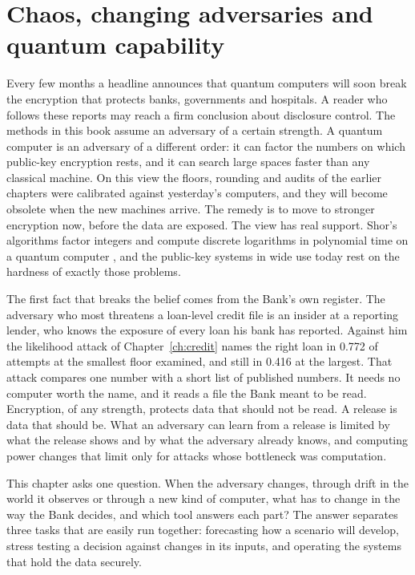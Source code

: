\chapter{Chaos, changing adversaries and quantum capability}\label{ch:chaos}

Every few months a headline announces that quantum computers will soon break the encryption
that protects banks, governments and hospitals. A reader who follows these reports may reach
a firm conclusion about disclosure control. The methods in this book assume an adversary of a
certain strength. A quantum computer is an adversary of a different order: it can factor the
numbers on which public-key encryption rests, and it can search large spaces faster than any
classical machine. On this view the floors, rounding and audits of the earlier chapters were
calibrated against yesterday's computers, and they will become obsolete when the new machines
arrive. The remedy is to move to stronger encryption now, before the data are exposed. The view
has real support. Shor's algorithms factor integers and compute discrete logarithms in polynomial
time on a quantum computer \citep{shor1997}, and the public-key systems in wide use today rest on
the hardness of exactly those problems.

The first fact that breaks the belief comes from the Bank's own register. The adversary who
most threatens a loan-level credit file is an insider at a reporting lender, who knows the
exposure of every loan his bank has reported. Against him the likelihood attack of
Chapter~\ref{ch:credit} names the right loan in 0.772 of attempts at the smallest floor examined,
and still in 0.416 at the largest. That attack compares one number with a short list of published
numbers. It needs no computer worth the name, and it reads a file the Bank meant to be read.
Encryption, of any strength, protects data that should not be read. A release is data that should
be. What an adversary can learn from a release is limited by what the release shows and by what
the adversary already knows, and computing power changes that limit only for attacks whose
bottleneck was computation.

This chapter asks one question. When the adversary changes, through drift in the world it
observes or through a new kind of computer, what has to change in the way the Bank decides, and
which tool answers each part? The answer separates three tasks that are easily run together:
forecasting how a scenario will develop, stress testing a decision against changes in its inputs,
and operating the systems that hold the data securely.

